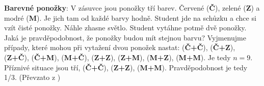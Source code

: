 \begin{example}
 \label{mai:exam006}
  \textbf{Barevné ponožky}:\newline\small
  V zásuvce jsou ponožky tří barev. Červené (\textbf{Č}), zelené (\textbf{Z}) a modré (\textbf{M}). 
  Je jich tam od každé barvy hodně. Student jde na schůzku a chce si vzít čisté ponožky. Náhle 
  zhasne světlo. Student vytáhne potmě dvě ponožky. Jaká je pravděpodobnost, že ponožky budou mít 
  stejnou barvu? Vyjmenujme případy, které mohou při vytažení dvou ponožek nastat: (\textbf{Č+Č}), 
  (\textbf{Č+Z}), (\textbf{Z+Č}), (\textbf{Č+M}), (\textbf{M+Č}), (\textbf{Z+Z}), (\textbf{Z+M}), 
  (\textbf{M+Z}), (\textbf{M+M}). Je tedy \(n = 9\). Příznivé situace jsou tří, (\textbf{Č+Č}), 
  (\textbf{Z+Z}), (\textbf{M+M}). Pravděpodobnost je tedy 1/3. (Převzato z 
  \cite[s.~200]{Musilova2009MA1}) 
\normalsize
\end{example}